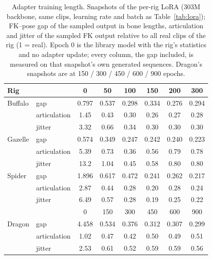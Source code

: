\begin{table}[h]
\centering\footnotesize\setlength{\tabcolsep}{4pt}
\caption{Adapter training length. Snapshots of the per-rig LoRA (\num{303}M backbone, same clips, learning rate and
batch as Table~\ref{tab:lora}); FK--pose gap of the sampled output in bone lengths, articulation and jitter of the
sampled FK output relative to all real clips of the rig (1 = real). Epoch 0 is the library model with the
rig's statistics and no adapter update; every column, the gap included, is measured on that snapshot's own
generated sequences. Dragon's snapshots are at 150 / 300 / 450 / 600 / 900 epochs.}\label{tab:lora_len}
\begin{tabular}{@{}llcccccc@{}}
\toprule
Rig & & 0 & 50 & 100 & 150 & 200 & 300 \\
\midrule
Buffalo & gap & \num{0.797} & \num{0.537} & \num{0.298} & \num{0.334} & \num{0.276} & \num{0.294} \\
 & articulation & \num{1.45} & \num{0.43} & \num{0.30} & \num{0.26} & \num{0.27} & \num{0.28} \\
 & jitter & \num{3.32} & \num{0.66} & \num{0.34} & \num{0.30} & \num{0.30} & \num{0.30} \\
\midrule
Gazelle & gap & \num{0.574} & \num{0.349} & \num{0.247} & \num{0.242} & \num{0.240} & \num{0.223} \\
 & articulation & \num{5.39} & \num{0.73} & \num{0.36} & \num{0.56} & \num{0.79} & \num{0.78} \\
 & jitter & \num{13.2} & \num{1.04} & \num{0.45} & \num{0.58} & \num{0.80} & \num{0.80} \\
\midrule
Spider & gap & \num{1.896} & \num{0.617} & \num{0.472} & \num{0.241} & \num{0.262} & \num{0.217} \\
 & articulation & \num{2.87} & \num{0.44} & \num{0.28} & \num{0.20} & \num{0.28} & \num{0.24} \\
 & jitter & \num{6.49} & \num{0.57} & \num{0.28} & \num{0.19} & \num{0.25} & \num{0.22} \\
\midrule
 & & 0 & 150 & 300 & 450 & 600 & 900 \\
Dragon & gap & \num{4.458} & \num{0.534} & \num{0.376} & \num{0.312} & \num{0.307} & \num{0.299} \\
 & articulation & \num{1.02} & \num{0.47} & \num{0.42} & \num{0.50} & \num{0.49} & \num{0.51} \\
 & jitter & \num{2.53} & \num{0.61} & \num{0.52} & \num{0.59} & \num{0.59} & \num{0.56} \\
\bottomrule
\end{tabular}
\end{table}

